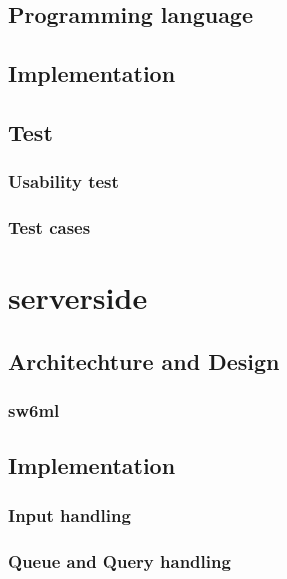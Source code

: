      \subsection{Programming language}
      
     \subsection{Implementation}
     	
     \subsection{Test}
     \subsubsection{Usability test}
			
		\subsubsection{Test cases}
		

  \section{serverside} %
    
    \subsection{Architechture and Design}
      \label{sect:ssArchAndDesign}
      
      \subsubsection{sw6ml} %
         \label{sw6ml}
	  
	  
    \subsection{Implementation}
      \subsubsection{Input handling} %
		
      \subsubsection{Queue and Query handling} %
	  \label{QQHandling}
	    
